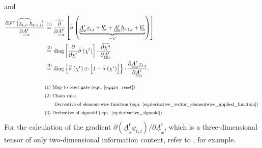 and
\begin{align} \label{eq:gru_grad_intra_reset_2_Arx} 
    \widehat{
        \frac{\partial \mathcal{F}^\text{r}\left(\underline x_{t, i}, \underline h_{t\text -1, i}\right)}
            {\partial \underline{\underline{A}}^\text{r}_x} 
    }
    &\overset{\textcolor{black}{(1)}}{=}
    \widehat{
        \frac{\partial}{\partial \underline{\underline{A}}^\text{r}_x} 
    }
    \left[
        \overset{\scriptscriptstyle \odot}{\sigma} \left(
            \underbrace{
            \underline{\underline A}^\text{r}_{x}
            \underline x_{t,i}
            +
            \underline b^\text{r}_{x}
            +
            \underline{\underline A}^\text{r}_{h}
            \underline h_{t\text -1,i}
            +
            \underline b^\text{r}_{h}}_{:=\chi^\text{r}}
        \right)
    \right]
    \nonumber \\ & \overset{\textcolor{black}{(2)}}{=}
    \mathrm{diag} \left[
        \frac{\partial}{\partial \chi^\text{r}}
        \overset{\scriptscriptstyle \odot}{\sigma} \left(\chi^\text{r}\right)
    \right]
    \cdot
    \widehat{
        \frac{\partial \chi^\text{u}{}}
            {\partial \underline{\underline{A}}^\text{r}_x} 
    }
    \nonumber \\ & \overset{\textcolor{black}{(3)}}{=}
    \mathrm{diag} \left\{
        \overset{\scriptscriptstyle \odot}{\sigma} \left(\chi^\text{r}\right)
        \odot
        \left[
            1 -  \overset{\scriptscriptstyle \odot}{\sigma} \left(\chi^\text{r}\right)
        \right]
    \right\}
    \cdot
    \frac{\partial \underline{\underline A}^\text{r}_{x}\underline x_{t,i}}
        {\partial \underline{\underline{A}}^\text{r}_x} 
        .
    \\[2ex]
        &\textcolor{black}{\text{\footnotesize (1) 
            Map to reset gate (equ. \ref{eq:gru_reset})}} \nonumber \\
        &\textcolor{black}{\text{\footnotesize (2) 
            Chain rule;
        }} \nonumber \\
        &\textcolor{black}{\text{\footnotesize \qquad
            Derivative of element-wise function
            (equ. \ref{eq:derivative_vector_elementwise_applied_function})
        }} \nonumber \\
        &\textcolor{black}{\text{\footnotesize (3) 
            Derivative of sigmoid (equ. \ref{eq:derivative_sigmoid})
        }} \nonumber
\end{align}
For the calculation of the gradient
$\partial \left(\underline{\underline A}^\text{r}_{x}\underline x_{t,i}\right)
        /\partial \underline{\underline{A}}^\text{r}_x
$,
which is a three-dimensional tensor 
of only two-dimensional information content, 
refer to \cite{LearnedMiller}, for example.

